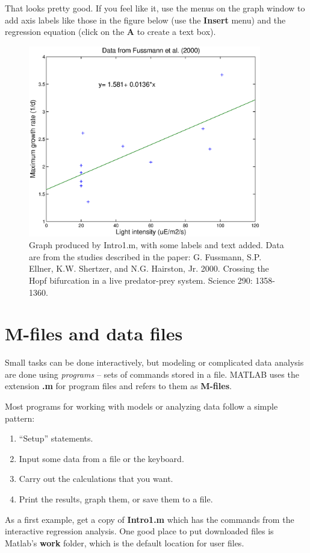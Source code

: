 \documentclass [11pt]{article}
\numberwithin{exercise}{section}
\begin{document}
That looks pretty good. If you feel like it, use the menus on the graph 
window to add axis labels like those in the figure below (use the 
\textbf{Insert} menu) and the regression equation (click on the \textbf{A 
}to create a text box). 

\begin{figure}[htbp]
\centerline{\includegraphics[width=4in]{figures/MatlabIntro1.eps}}
\caption{Graph produced by Intro1.m, with some labels and text added. Data are from the 
studies described in the paper: G. Fussmann, S.P. Ellner, K.W. Shertzer, and N.G. Hairston, Jr. 2000. 
Crossing the Hopf bifurcation in a live predator-prey system. Science 290: 1358-1360.} 
\label{fig1}
\end{figure}

\section{M-files and data files}
\vspace{-0.15in} 
Small tasks can be done interactively, but modeling or complicated data 
analysis are done using \textit{programs} -- sets of commands stored in a file. 
MATLAB uses the extension \textbf{.m} for program files and refers to them 
as \textbf{M-files}. 

Most programs for working with models or analyzing data follow a
simple pattern:
\begin{enumerate}
\item ``Setup'' statements.
\item Input some data from a file or the keyboard.
\item Carry out the calculations that you want.
\item Print the results, graph them, or save them to a file.
\end{enumerate}
As a first example, get a copy of \textbf{Intro1.m} which has the commands from the 
interactive regression analysis. One good place to put downloaded files is 
Matlab's \textbf{work} folder, which is the default location for user 
files.
\end{document}
